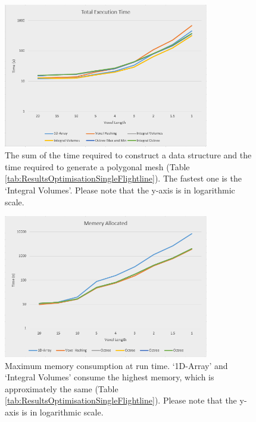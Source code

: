 \documentclass{subfiles}
\begin{document}
\begin{figure}[!htbp]
	\centering
	\includegraphics[width=0.8\textwidth]{img/opt/TotalExecutionTime.png}
	\caption[Total Execution Time]{The sum of the time required to construct a data structure and the time required to generate a polygonal mesh (Table \ref{tab:ResultsOptimisationSingleFlightline}). The fastest one is the `Integral Volumes'. Please note that the y-axis is in logarithmic scale.}
	\label{fig:TotalTime}
\end{figure}

\begin{figure}[!htbp]
	\centering
	\includegraphics[width=0.8\textwidth]{img/opt/MemoryConsumption}
	\caption[Maximum Memory Consumption] {Maximum memory consumption at run time. `1D-Array' and `Integral Volumes' consume the highest memory, which is approximately the same (Table \ref{tab:ResultsOptimisationSingleFlightline}). Please note that the y-axis is in logarithmic scale.}
	\label{fig:MemoryConsumption}
\end{figure}
\end{document}
